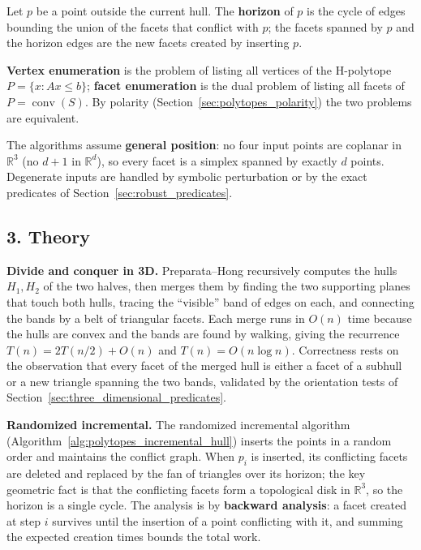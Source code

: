 \begin{definition}[Horizon]\label{def:polytopes_horizon}
  Let $p$ be a point outside the current hull. The \textbf{horizon} of $p$
  is the cycle of edges bounding the union of the facets that conflict with
  $p$; the facets spanned by $p$ and the horizon edges are the new facets
  created by inserting $p$.
\end{definition}

\begin{definition}\label{def:polytopes_vertex_enumeration}
  \textbf{Vertex enumeration} is the problem of listing all vertices of the
  H-polytope $P = \{ x : Ax \le b \}$; \textbf{facet enumeration} is the
  dual problem of listing all facets of $P = \operatorname{conv}(S)$. By
  polarity (Section~\ref{sec:polytopes_polarity}) the two problems are
  equivalent.
\end{definition}

The algorithms assume \textbf{general position}: no four input points are
coplanar in $\mathbb{R}^3$ (no $d+1$ in $\mathbb{R}^d$), so every facet is a
simplex spanned by exactly $d$ points. Degenerate inputs are handled by
symbolic perturbation or by the exact predicates of
Section~\ref{sec:robust_predicates}.

\subsection{3. Theory}

\textbf{Divide and conquer in 3D.} Preparata--Hong \cite{preparata1977}
recursively computes the hulls $H_1, H_2$ of the two halves, then merges
them by finding the two supporting planes that touch both hulls, tracing the
``visible'' band of edges on each, and connecting the bands by a belt of
triangular facets. Each merge runs in $O(n)$ time because the hulls are
convex and the bands are found by walking, giving the recurrence
$T(n) = 2T(n/2) + O(n)$ and $T(n) = O(n \log n)$. Correctness rests on the
observation that every facet of the merged hull is either a facet of a
subhull or a new triangle spanning the two bands, validated by the
orientation tests of Section~\ref{sec:three_dimensional_predicates}.

\textbf{Randomized incremental.} The randomized incremental algorithm
(Algorithm~\ref{alg:polytopes_incremental_hull}) inserts the points in a
random order and maintains the conflict graph. When $p_i$ is inserted, its
conflicting facets are deleted and replaced by the fan of triangles over its
horizon; the key geometric fact is that the conflicting facets form a
topological disk in $\mathbb{R}^3$, so the horizon is a single cycle. The
analysis is by \textbf{backward analysis}: a facet created at step $i$
survives until the insertion of a point conflicting with it, and summing the
expected creation times bounds the total work.

